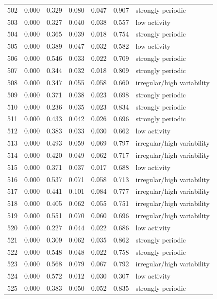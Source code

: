 \begin{longtable}{lrrrrrl}
502 & 0.000 & 0.329 & 0.080 & 0.047 & 0.907 & strongly periodic \\
503 & 0.000 & 0.327 & 0.040 & 0.038 & 0.557 & low activity \\
504 & 0.000 & 0.365 & 0.039 & 0.018 & 0.754 & strongly periodic \\
505 & 0.000 & 0.389 & 0.047 & 0.032 & 0.582 & low activity \\
506 & 0.000 & 0.546 & 0.033 & 0.022 & 0.709 & strongly periodic \\
507 & 0.000 & 0.344 & 0.032 & 0.018 & 0.809 & strongly periodic \\
508 & 0.000 & 0.347 & 0.055 & 0.058 & 0.660 & irregular/high variability \\
509 & 0.000 & 0.371 & 0.038 & 0.023 & 0.698 & strongly periodic \\
510 & 0.000 & 0.236 & 0.035 & 0.023 & 0.834 & strongly periodic \\
511 & 0.000 & 0.433 & 0.042 & 0.026 & 0.696 & strongly periodic \\
512 & 0.000 & 0.383 & 0.033 & 0.030 & 0.662 & low activity \\
513 & 0.000 & 0.493 & 0.059 & 0.069 & 0.797 & irregular/high variability \\
514 & 0.000 & 0.420 & 0.049 & 0.062 & 0.717 & irregular/high variability \\
515 & 0.000 & 0.371 & 0.037 & 0.017 & 0.688 & low activity \\
516 & 0.000 & 0.537 & 0.071 & 0.058 & 0.713 & irregular/high variability \\
517 & 0.000 & 0.441 & 0.101 & 0.084 & 0.777 & irregular/high variability \\
518 & 0.000 & 0.405 & 0.062 & 0.055 & 0.751 & irregular/high variability \\
519 & 0.000 & 0.551 & 0.070 & 0.060 & 0.696 & irregular/high variability \\
520 & 0.000 & 0.227 & 0.044 & 0.022 & 0.686 & low activity \\
521 & 0.000 & 0.309 & 0.062 & 0.035 & 0.862 & strongly periodic \\
522 & 0.000 & 0.548 & 0.048 & 0.022 & 0.758 & strongly periodic \\
523 & 0.000 & 0.568 & 0.079 & 0.067 & 0.792 & irregular/high variability \\
524 & 0.000 & 0.572 & 0.012 & 0.030 & 0.307 & low activity \\
525 & 0.000 & 0.383 & 0.050 & 0.052 & 0.835 & strongly periodic \\

\end{longtable}
